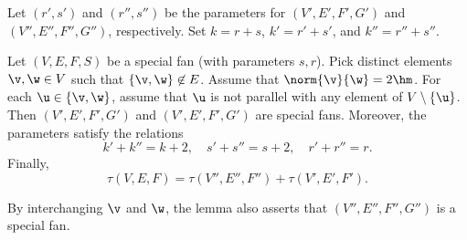 Let $(r',s')$ and $(r'',s'')$ be the parameters for $(V',E',F',G')$
and $(V'',E'',F'',G'')$, respectively.  Set $k=r+s$, $k'=r'+s'$, and
$k''=r''+s''$.

\begin{lemma}\label{lemma:param-add}  
Let $(V,E,F,S)$ be a special fan (with parameters $s,r$).  Pick
distinct elements $\v,\w\in V$ such that $\{\v,\w\}\not\in E$.
Assume that $\norm{\v}{\w}=2\hm$.  For each $\u\in \{\v,\w\}$,
assume that $\u$ is not parallel with any element of 
$V\setminus\{\u\}$.
Then $(V',E',F',G')$ and $(V',E',F',G')$ are special fans.  Moreover,
the parameters satisfy the relations
\begin{displaymath}
k'+k'' = k + 2,\quad s'+s'' = s + 2,\quad r'+r''=r.
\end{displaymath}
Finally,
\begin{displaymath}
\tau(V,E,F)= \tau(V'',E'',F'') +\tau(V',E',F').
\end{displaymath}
\end{lemma}

By interchanging $\v$ and $\w$, the lemma also asserts that
$(V'',E'',F'',G'')$ is a special fan.

